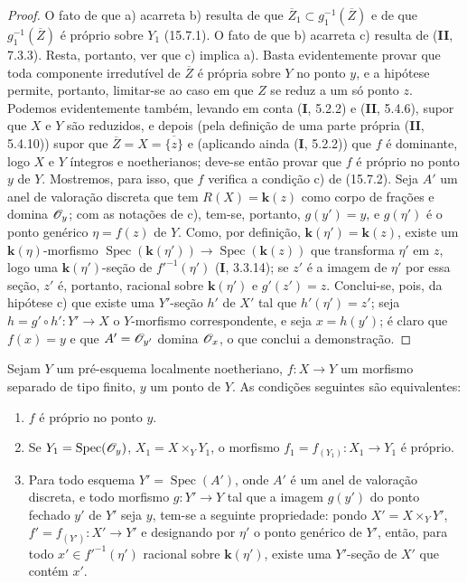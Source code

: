 \begin{proof}
O fato de que a) acarreta b) resulta de que $\overline Z_1\subset g_1^{-1}(\overline Z)$ e de que $g_1^{-1}(\overline Z)$ é próprio sobre $Y_1$ (15.7.1). O fato de que b) acarreta c) resulta de (\textbf{II}, 7.3.3). Resta, portanto, ver que c) implica a). Basta evidentemente provar que toda componente irredutível de $\overline Z$ é própria sobre $Y$ no ponto $y$, e a hipótese permite, portanto, limitar-se ao caso em que $Z$ se reduz a um só ponto $z$. Podemos evidentemente também, levando em conta (\textbf{I}, 5.2.2) e (\textbf{II}, 5.4.6), supor que $X$ e $Y$ são reduzidos, e depois (pela definição de uma parte própria (\textbf{II}, 5.4.10)) supor que $\overline Z=X=\overline{\{z\}}$ e (aplicando ainda (\textbf{I}, 5.2.2)) que $f$ é dominante, logo $X$ e $Y$ íntegros e noetherianos; deve-se então provar que $f$ é próprio no ponto $y$ de $Y$. Mostremos, para isso, que $f$ verifica a condição c) de (15.7.2). Seja $A'$ um anel de valoração discreta que tem $R(X)=\mathbf k(z)$ como corpo de frações e domina $\mathscr{O}_y$; com as notações de c), tem-se, portanto, $g(y')=y$, e $g(\eta')$ é o ponto genérico $\eta=f(z)$ de $Y$. Como, por definição, $\mathbf k(\eta')=\mathbf k(z)$, existe um $\mathbf k(\eta)$-morfismo $\operatorname{Spec}(\mathbf k(\eta'))\to\operatorname{Spec}(\mathbf k(z))$ que transforma $\eta'$ em $z$, logo uma $\mathbf k(\eta')$-seção de $f'^{-1}(\eta')$ (\textbf{I}, 3.3.14); se $z'$ é a imagem de $\eta'$ por essa seção, $z'$ é, portanto, racional sobre $\mathbf k(\eta')$ e $g'(z')=z$. Conclui-se, pois, da hipótese c) que existe uma $Y'$-seção $h'$ de $X'$ tal que $h'(\eta')=z'$; seja $h=g'\circ h':Y'\to X$ o $Y$-morfismo correspondente, e seja $x=h(y')$; é claro que $f(x)=y$ e que $A'=\mathscr{O}_{y'}$ domina $\mathscr{O}_x$, o que conclui a demonstração.
\end{proof}

\begin{corollary}[15.7.5]
\label{IV.15.7.5}
Sejam $Y$ um pré-esquema localmente noetheriano, $f:X\to Y$ um morfismo separado de tipo finito, $y$ um ponto de $Y$. As condições seguintes são equivalentes:
\begin{enumerate}
  \item[\rm a)] $f$ é próprio no ponto $y$.
  \item[\rm b)] Se $Y_1=\operatorname{Spec}(\mathscr{O}_y)$, $X_1=X\times_Y Y_1$, o morfismo $f_1=f_{(Y_1)}:X_1\to Y_1$ é próprio.
  \item[\rm c)] Para todo esquema $Y'=\operatorname{Spec}(A')$, onde $A'$ é um anel de valoração discreta, e todo morfismo $g:Y'\to Y$ tal que a imagem $g(y')$ do ponto fechado $y'$ de $Y'$ seja $y$, tem-se a seguinte propriedade: pondo $X'=X\times_Y Y'$, $f'=f_{(Y')}:X'\to Y'$ e designando por $\eta'$ o ponto genérico de $Y'$, então, para todo $x'\in f'^{-1}(\eta')$ racional sobre $\mathbf k(\eta')$, existe uma $Y'$-seção de $X'$ que contém $x'$.
\end{enumerate}
\end{corollary}


